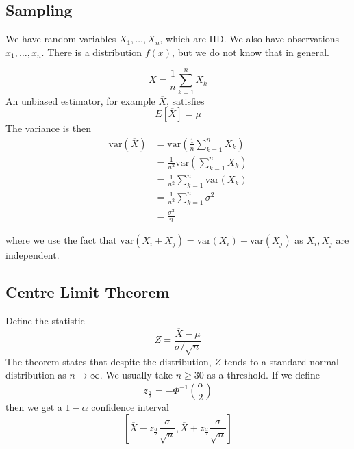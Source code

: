 \documentclass[12pt]{article}
\begin{document}
\subsection{Sampling}

We have random variables $X_1,\dots,X_n$, which are IID. We also have observations $x_1,\dots,x_n$. There is a distribution $f(x)$, but we do not know that in general.

$$\overline{X} = \frac{1}{n} \sum_{k=1}^n X_k$$
An unbiased estimator, for example $\overline{X}$, satisfies
$$E[\overline{X}] = \mu$$
The variance is then
\begin{align*}
	\text{var}(\overline{X}) &= \text{var}\left(\frac{1}{n}\sum_{k=1}^n X_k\right) \\
				 &= \frac{1}{n^2}\text{var}\left(\sum_{k=1}^n X_k\right) \\
				 &= \frac{1}{n^2} \sum_{k=1}^n \text{var}(X_k) \\
				 &= \frac{1}{n^2} \sum_{k=1}^n \sigma^2 \\
				 &= \frac{\sigma^2}{n}
\end{align*}

where we use the fact that $\text{var}(X_i+X_j) = \text{var}(X_i) + \text{var}(X_j)$ as $X_i,X_j$ are independent.

\subsection{Centre Limit Theorem}

Define the statistic
$$Z = \frac{\overline{X}-\mu}{\sigma/\sqrt{n}}$$
The theorem states that despite the distribution, $Z$ tends to a standard normal distribution as $n \rightarrow \infty$. We usually take $n \geq 30$ as a threshold. If we define
$$z_{\frac{\alpha}{2}} = -\Phi^{-1}\left(\frac{\alpha}{2}\right)$$
then we get a $1-\alpha$ confidence interval
$$\left[\overline{X} - z_{\frac{\alpha}{2}}\frac{\sigma}{\sqrt{n}},\overline{X} + z_{\frac{\alpha}{2}}\frac{\sigma}{\sqrt{n}}\right]$$
\end{document}
